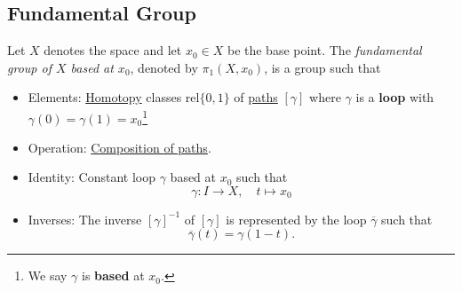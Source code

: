 \subsection{Fundamental Group}
\begin{definition}\label{def:fundamental-group}
	Let \(X\) denotes the space and let \(x_0\in X\) be the base point. The \emph{fundamental group of \(X\) based at \(x_0\)},
	denoted by \(\pi_1(X, x_0)\), is a group such that
	\begin{itemize}
		\item Elements: \hyperref[def:homotopy]{Homotopy} classes \(\mathrm{rel} \{0, 1\}\) of \hyperref[def:path]{paths} \([\gamma]\) where \(\gamma\) is a \textbf{loop}
		      with \(\gamma(0) = \gamma(1) = x_0\)\footnote{We say \(\gamma\) is \textbf{based} at \(x_0\).}
		      \begin{center}
		      \end{center}
		\item Operation: \hyperref[def:path-composition]{Composition of paths}.
		\item Identity: Constant loop \(\gamma\) based at \(x_0\) such that
		      \[
			      \gamma\colon I\to X,\quad t\mapsto x_0
		      \]
		\item Inverses: The inverse \([\gamma]^{-1}\) of \([\gamma]\) is represented by the loop \(\overline{\gamma}\) such that
		      \[
			      \overline{\gamma} (t) = \gamma(1-t).
		      \]
		      \begin{center}
		      \end{center}
	\end{itemize}
\end{definition}
